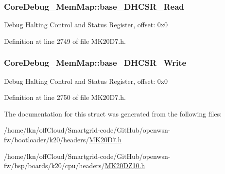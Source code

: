 \subsubsection[{\texorpdfstring{base\+\_\+\+D\+H\+C\+S\+R\+\_\+\+Read}{base_DHCSR_Read}}]{ Core\+Debug\+\_\+\+Mem\+Map\+::base\+\_\+\+D\+H\+C\+S\+R\+\_\+\+Read}\hypertarget{struct_core_debug___mem_map_a4968901505f61e2a98c9196a8ac7584b}{}\label{struct_core_debug___mem_map_a4968901505f61e2a98c9196a8ac7584b}
Debug Halting Control and Status Register, offset\+: 0x0 

Definition at line 2749 of file M\+K20\+D7.\+h.

\subsubsection[{\texorpdfstring{base\+\_\+\+D\+H\+C\+S\+R\+\_\+\+Write}{base_DHCSR_Write}}]{ Core\+Debug\+\_\+\+Mem\+Map\+::base\+\_\+\+D\+H\+C\+S\+R\+\_\+\+Write}\hypertarget{struct_core_debug___mem_map_a57de52c8c1eb5789546543f2408ce487}{}\label{struct_core_debug___mem_map_a57de52c8c1eb5789546543f2408ce487}
Debug Halting Control and Status Register, offset\+: 0x0 

Definition at line 2750 of file M\+K20\+D7.\+h.



The documentation for this struct was generated from the following files\+:\begin{DoxyCompactItemize}
\item 
/home/lkn/off\+Cloud/\+Smartgrid-\/code/\+Git\+Hub/openwsn-\/fw/bootloader/k20/headers/\hyperlink{bootloader_2k20_2headers_2_m_k20_d7_8h}{M\+K20\+D7.\+h}\item 
/home/lkn/off\+Cloud/\+Smartgrid-\/code/\+Git\+Hub/openwsn-\/fw/bsp/boards/k20/cpu/headers/\hyperlink{_m_k20_d_z10_8h}{M\+K20\+D\+Z10.\+h}\end{DoxyCompactItemize}
